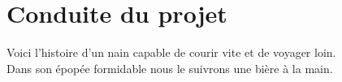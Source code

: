 \newpage
\section{Conduite du projet}
Voici l'histoire d'un nain capable de courir vite et de voyager loin.\\
Dans son épopée formidable nous le suivrons une bière à la main.\\
